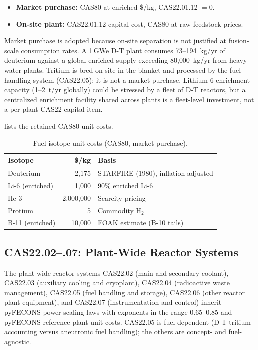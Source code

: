 \documentclass{article}
\begin{document}
\begin{itemize}
\item \textbf{Market purchase:} CAS80 at enriched \$/kg, CAS22.01.12 $= 0$.
\item \textbf{On-site plant:} CAS22.01.12 capital cost, CAS80 at raw
  feedstock prices.
\end{itemize}

Market purchase is adopted because on-site separation is not justified
at fusion-scale consumption rates. A 1\,GWe D-T plant consumes
73--194~kg/yr of deuterium against a global enriched supply exceeding
80{,}000~kg/yr from heavy-water plants. Tritium is bred on-site in the
blanket and processed by the fuel handling system (CAS22.05); it is not a
market purchase. Lithium-6 enrichment capacity (1--2~t/yr
globally) could be stressed by a fleet of D-T reactors, but a
centralized enrichment facility shared across plants is a fleet-level
investment, not a per-plant CAS22 capital item.

 lists the retained CAS80 unit costs.

\begin{table}[htbp]
\caption{Fuel isotope unit costs (CAS80, market purchase).}
\label{tab:fuel-prices}
\centering
\begin{tabular}{lrl}
\toprule
Isotope & \$/kg & Basis \\
\midrule
Deuterium & 2{,}175 & STARFIRE (1980), inflation-adjusted \\
Li-6 (enriched) & 1{,}000 & 90\% enriched Li-6 \\
He-3 & 2{,}000{,}000 & Scarcity pricing \\
Protium & 5 & Commodity H$_2$ \\
B-11 (enriched) & 10{,}000 & FOAK estimate (B-10 tails) \\
\bottomrule
\end{tabular}
\end{table}


\subsection{CAS22.02--.07: Plant-Wide Reactor Systems}
\label{sec:cas2207-cluster}

The plant-wide reactor systems CAS22.02 (main and secondary coolant),
CAS22.03 (auxiliary cooling and cryoplant), CAS22.04 (radioactive
waste management), CAS22.05 (fuel handling and storage), CAS22.06
(other reactor plant equipment), and CAS22.07 (instrumentation and
control) inherit pyFECONS power-scaling laws with exponents in the
range 0.65--0.85 and pyFECONS reference-plant unit costs. CAS22.05
is fuel-dependent (D-T tritium accounting versus aneutronic fuel
handling); the others are concept- and fuel-agnostic.
\end{document}
